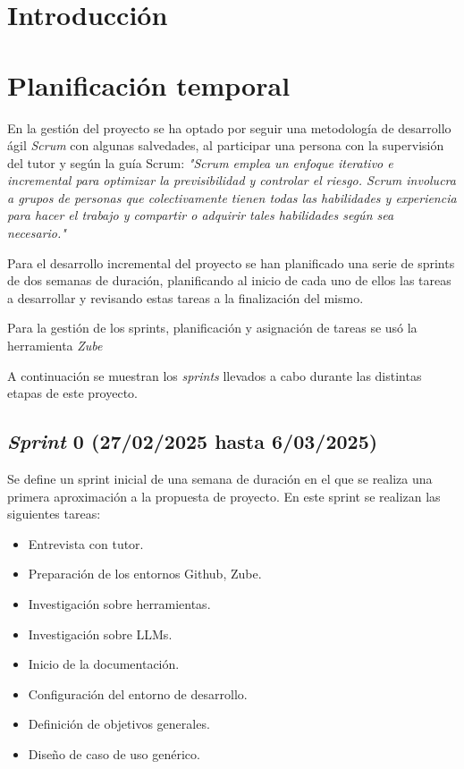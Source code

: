 
\section{Introducción}

\section{Planificación temporal}
En la gestión del proyecto se ha optado por seguir una metodología de desarrollo ágil \textit{Scrum} con algunas salvedades, al participar una persona con la supervisión del tutor y según la guía Scrum: \textit{"Scrum emplea un enfoque iterativo e incremental para optimizar la previsibilidad y controlar el riesgo.
Scrum involucra a grupos de personas que colectivamente tienen todas las habilidades y experiencia
para hacer el trabajo y compartir o adquirir tales habilidades según sea necesario."}~\cite{scrumguides:guia}

Para el desarrollo incremental del proyecto se han planificado una serie de sprints de dos semanas de duración, planificando al inicio de cada uno de ellos las tareas a desarrollar y revisando estas tareas a la finalización del mismo.

Para la gestión de los sprints, planificación y asignación de tareas se usó la herramienta \textit{Zube}

A continuación se muestran los \textit{sprints} llevados a cabo durante las distintas etapas de este proyecto.

\subsection{\emph{Sprint} 0 (27/02/2025 hasta 6/03/2025)}
Se define un sprint inicial de una semana de duración en el que se realiza una primera aproximación a la propuesta de proyecto. En este sprint se realizan las siguientes tareas:

\begin{itemize}
    \item Entrevista con tutor.
    \item Preparación de los entornos Github, Zube.
    \item Investigación sobre herramientas.
    \item Investigación sobre LLMs.
    \item Inicio de la documentación.
    \item Configuración del entorno de desarrollo.
    \item Definición de objetivos generales.
    \item Diseño de caso de uso genérico.
\end{itemize}

